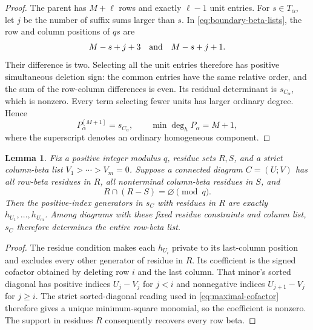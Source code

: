 \documentclass[11pt,a4paper]{amsart}
\numberwithin{equation}{section}
\theoremstyle{plain}
\newtheorem{lemma}[theorem]{Lemma}
\theoremstyle{definition}
\begin{document}
\begin{proof}
The parent has \(M+\ell\) rows and exactly \(\ell-1\) unit
entries.  For \(s\in T_\alpha\), let \(j\) be the number of
suffix sums larger than \(s\).  In \eqref{eq:boundary-beta-lists},
the row and column positions of \(qs\) are
\[
 M-s+j+3\quad\hbox{and}\quad M-s+j+1.
\]
Their difference is two.  Selecting all the unit entries therefore has
positive simultaneous deletion sign: the common entries have the same
relative order, and the sum of the row-column differences is even.
Its residual determinant is \(s_{C_\alpha}\), which is nonzero.
Every term selecting fewer units has larger ordinary degree.  Hence
\begin{equation}\label{eq:boundary-lowest-degree}
 P_\alpha^{[M+1]}=s_{C_\alpha},\qquad
 \min\deg_h P_\alpha=M+1,
\end{equation}
where the superscript denotes an ordinary homogeneous component.
\end{proof}

\begin{lemma}\label{lem:private-residue-column}
Fix a positive integer modulus \(q\), residue sets \(R,S\), and a
strict column-beta list \(V_1>\cdots>V_m=0\).  Suppose a connected
diagram \(C=(U;V)\) has all row-beta residues in \(R\), all
nonterminal column-beta residues in \(S\), and
\begin{equation}\label{eq:private-residue-condition}
 R\cap(R-S)=\varnothing\pmod q.
\end{equation}
Then the positive-index generators in \(s_C\) with residues in
\(R\) are exactly
\(h_{U_1},\ldots,h_{U_m}\).  Among diagrams with these fixed residue
constraints and column list, \(s_C\) therefore determines the entire
row-beta list.
\end{lemma}

\begin{proof}
The residue condition makes each \(h_{U_i}\) private to its
last-column position and excludes every other generator of residue
in \(R\).  Its coefficient is the signed cofactor obtained by
deleting row \(i\) and the last column.  That minor's sorted diagonal
has positive indices \(U_j-V_j\) for \(j<i\) and nonnegative
indices \(U_{j+1}-V_j\) for \(j\ge i\).
The strict sorted-diagonal reading used in
\eqref{eq:maximal-cofactor} therefore gives a unique minimum-square
monomial, so the coefficient is nonzero.  The support in residues
\(R\) consequently recovers every row beta.
\end{proof}
\end{document}
